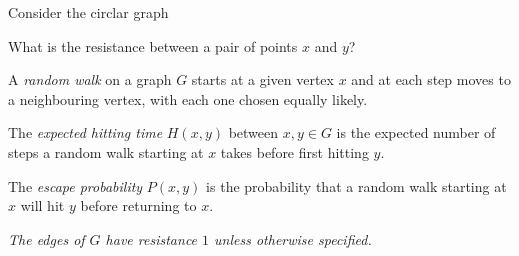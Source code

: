 \documentclass[11pt,fleqn]{book} %
\begin{document}
\begin{problem}
  Consider the circlar graph 
  \begin{center}
   \end{center} 
   What is the resistance between a pair of points $x$ and $y$?
\end{problem}


\begin{definition}
    A \emph{random walk} on a graph $G$ starts at a given vertex $x$ and at each step moves to a neighbouring vertex, with each one chosen equally likely.
\end{definition}


\begin{definition}
    The \textit{expected hitting time} $H(x,y)$ between $x,y\in G$ is the expected number of steps a random walk starting at $x$ takes before first hitting $y$.
\end{definition}



\begin{definition}
   The \emph{escape probability} $P(x,y)$ is the probability that a random walk starting at $x$ will hit $y$ before returning to $x$.
\end{definition}


\textit{The edges of $G$ have resistance $1$ unless otherwise specified.}
\end{document}
